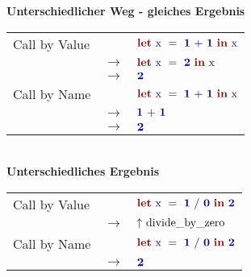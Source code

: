 {
  {\bf Unterschiedlicher Weg - gleiches Ergebnis}\\
  \begin{tabular}{p{5.5cm}@{}p{1.0cm}@{}p{17.0cm}@{}}
     Call by Value   & & $
                         \ExprLet{\ExprIdentifier{x}}{}
                         {\ExprInfixOperation{\ExprBinaryOperator{+}}{\ExprConstant{1}}{\ExprConstant{1}}}
                         {\ExprIdentifier{x}}
                         $\\ & $\to$ & $
                         \ExprLet{\ExprIdentifier{x}}{}
                         {\ExprConstant{2}}
                         {\ExprIdentifier{x}}
                         $\\ & $\to$ & $
                         \ExprConstant{2}
                         $\\
     Call by Name    & & $
                         \ExprLet{\ExprIdentifier{x}}{}
                         {\ExprInfixOperation{\ExprBinaryOperator{+}}{\ExprConstant{1}}{\ExprConstant{1}}}
                         {\ExprIdentifier{x}}
                         $\\ & $\to$ & $
                         \ExprInfixOperation{\ExprBinaryOperator{+}}{\ExprConstant{1}}{\ExprConstant{1}}
                         $\\ & $\to$ & $
                         \ExprConstant{2}
                         $
  \end{tabular}\\[3mm]
  {\bf Unterschiedliches Ergebnis}\\
  \begin{tabular}{p{5.5cm}@{}p{1.0cm}@{}p{17.0cm}@{}}
     Call by Value   & & $
                         \ExprLet{\ExprIdentifier{x}}{}
                         {\ExprInfixOperation{\ExprBinaryOperator{/}}{\ExprConstant{1}}{\ExprConstant{0}}}
                         {\ExprConstant{2}}
                         $\\ & $\to$ & $
                         \ExprExn{divide\_by\_zero}
                         $\\
     Call by Name    & & $
                         \ExprLet{\ExprIdentifier{x}}{}
                         {\ExprInfixOperation{\ExprBinaryOperator{/}}{\ExprConstant{1}}{\ExprConstant{0}}}
                         {\ExprConstant{2}}
                         $\\ & $\to$ & $
                         \ExprConstant{2}
                         $
  \end{tabular}
}